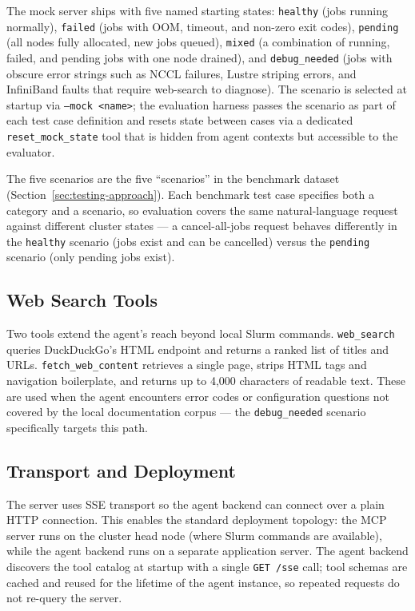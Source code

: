 The mock server ships with five named starting states: \texttt{healthy} (jobs running normally), \texttt{failed} (jobs with OOM, timeout, and non-zero exit codes), \texttt{pending} (all nodes fully allocated, new jobs queued), \texttt{mixed} (a combination of running, failed, and pending jobs with one node drained), and \texttt{debug\_needed} (jobs with obscure error strings such as NCCL failures, Lustre striping errors, and InfiniBand faults that require web-search to diagnose). The scenario is selected at startup via \texttt{--mock <name>}; the evaluation harness passes the scenario as part of each test case definition and resets state between cases via a dedicated \texttt{reset\_mock\_state} tool that is hidden from agent contexts but accessible to the evaluator.

The five scenarios are the five ``scenarios'' in the benchmark dataset (Section~\ref{sec:testing-approach}). Each benchmark test case specifies both a category and a scenario, so evaluation covers the same natural-language request against different cluster states — a cancel-all-jobs request behaves differently in the \texttt{healthy} scenario (jobs exist and can be cancelled) versus the \texttt{pending} scenario (only pending jobs exist).

\subsection{Web Search Tools}

Two tools extend the agent's reach beyond local Slurm commands. \texttt{web\_search} queries DuckDuckGo's HTML endpoint and returns a ranked list of titles and URLs. \texttt{fetch\_web\_content} retrieves a single page, strips HTML tags and navigation boilerplate, and returns up to 4,000 characters of readable text. These are used when the agent encounters error codes or configuration questions not covered by the local documentation corpus — the \texttt{debug\_needed} scenario specifically targets this path.

\subsection{Transport and Deployment}

The server uses SSE transport so the agent backend can connect over a plain HTTP connection. This enables the standard deployment topology: the MCP server runs on the cluster head node (where Slurm commands are available), while the agent backend runs on a separate application server. The agent backend discovers the tool catalog at startup with a single \texttt{GET /sse} call; tool schemas are cached and reused for the lifetime of the agent instance, so repeated requests do not re-query the server.
